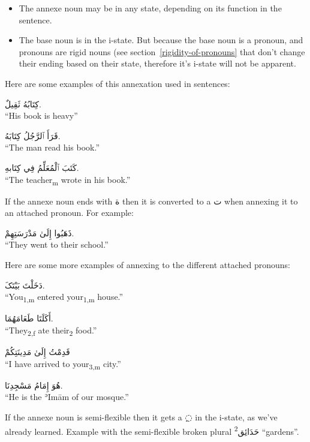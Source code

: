 \documentclass[
  10pt,
]{book}
\providecommand{\tightlist}{%
  \setlength{\itemsep}{0pt}\setlength{\parskip}{0pt}}
\begin{document}
\begin{itemize}
\tightlist
\item
  The annexe noun may be in any state, depending on its function in the sentence.
\item
  The base noun is in the i-state. But because the base noun is a pronoun, and pronouns are rigid nouns (see section~\ref{rigidity-of-pronouns} that don't change their ending based on their state, therefore it's i-state will not be apparent.
\end{itemize}

Here are some examples of this annexation used in sentences:

\foreignlanguage{arabic}{کِتَابُهُ ثَقِيلٌ.}\\
\enquote{His book is heavy}

\foreignlanguage{arabic}{قَرَأَ ٱلرَّجُلُ کِتَابَهُ.}\\
\enquote{The man read his book.}

\foreignlanguage{arabic}{کَتَبَ ٱلْمُعَلِّمُ فِي کِتَابهِ.}\\
\enquote{The teacher\textsubscript{m} wrote in his book.}

If the annexe noun ends with \foreignlanguage{arabic}{ة} then it is converted to a \foreignlanguage{arabic}{ت} when annexing it to an attached pronoun. For example:

\foreignlanguage{arabic}{ذَهَبُوا إِلَىٰ مَدْرَسَتِهِمْ.}\\
\enquote{They went to their school.}

Here are some more examples of annexing to the different attached pronouns:

\foreignlanguage{arabic}{دَخَلْتَ بَيْتَکَ.}\\
\enquote{You\textsubscript{1,m} entered your\textsubscript{1,m} house.}

\foreignlanguage{arabic}{أَکَلَتَا طَعَامَهُمَا.}\\
\enquote{They\textsubscript{2,f} ate their\textsubscript{2} food.}

\foreignlanguage{arabic}{قَدِمْتُ إِلَىٰ مَدِينَتِکُمْ}\\
\enquote{I have arrived to your\textsubscript{3,m} city.}

\foreignlanguage{arabic}{هُوَ إِمَامُ مَسْجِدِنَا.}\\
\enquote{He is the ʾImām of our mosque.}

If the annexe noun is semi-flexible then it gets a \foreignlanguage{arabic}{◌ِ} in the i-state, as we've already learned. Example with the semi-flexible broken plural \textsuperscript{2}\foreignlanguage{arabic}{حَدَائِق} \enquote{gardens}.
\end{document}
